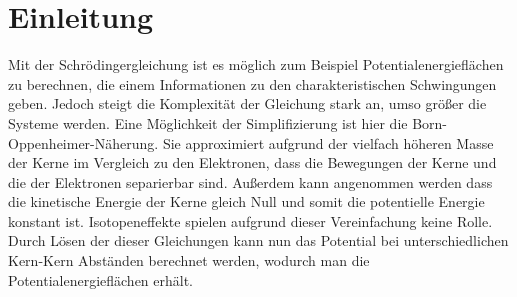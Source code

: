 \documentclass[a4paper]{scrartcl}
\begin{document}
\section{Einleitung}
 Mit der Schrödingergleichung ist es möglich zum Beispiel Potentialenergieflächen zu berechnen, die einem Informationen zu den charakteristischen Schwingungen  geben. Jedoch steigt die Komplexität der Gleichung stark an, umso größer die Systeme werden. Eine Möglichkeit der Simplifizierung ist hier die Born-Oppenheimer-Näherung. Sie approximiert aufgrund der vielfach höheren Masse der Kerne im Vergleich zu den Elektronen, dass die Bewegungen der Kerne und die der Elektronen separierbar sind. Außerdem kann angenommen werden dass die kinetische Energie der Kerne gleich Null und somit die potentielle Energie konstant ist. Isotopeneffekte spielen aufgrund dieser Vereinfachung keine Rolle.
Durch Lösen der dieser Gleichungen kann nun das Potential bei unterschiedlichen Kern-Kern Abständen berechnet werden, wodurch man die Potentialenergieflächen erhält.
\end{document}
